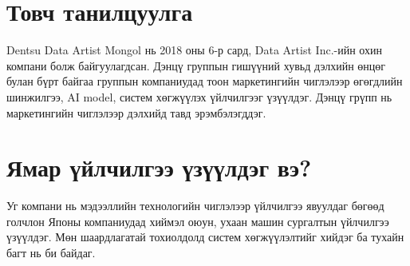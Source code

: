 \section{Товч танилцуулга}
\quad \quad	Dentsu Data Artist Mongol нь 2018 оны 6-р сард, Data Artist Inc.-ийн охин компани болж байгуулагдсан. Дэнцү группын гишүүний хувьд дэлхийн өнцөг булан бүрт байгаа группын компаниудад тоон маркетингийн чиглэлээр өгөгдлийн шинжилгээ, AI model, систем хөгжүүлэх үйлчилгээг үзүүлдэг. Дэнцү грүпп нь маркетингийн чиглэлээр дэлхийд тавд эрэмбэлэгддэг.

\section{Ямар үйлчилгээ үзүүлдэг вэ?}
\quad \quad	Уг компани нь мэдээллийн технологийн чиглэлээр үйлчилгээ явуулдаг бөгөөд голчлон Японы компаниудад хиймэл оюун, ухаан машин сургалтын үйлчилгээ үзүүлдэг. Мөн шаардлагатай тохиолдолд систем хөгжүүлэлтийг хийдэг ба тухайн багт нь би байдаг.
